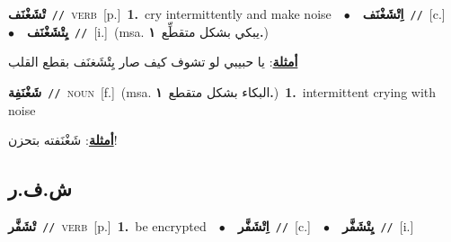 \documentclass[10pt,a4paper,twoside]{article} %
\begin{document}
\begin{multicols}{2}
{\setlength\topsep{0pt}\textbf{\foreignlanguage{arabic}{تْشَغْنَف}}\ {\color{gray}\texttt{//}\color{black}}\ \textsc{verb}\ [p.]\ \textbf{1.}~cry intermittently and make noise\ \ $\bullet$\ \ \setlength\topsep{0pt}\textbf{\foreignlanguage{arabic}{اِتْشَغْنَف}}\ {\color{gray}\texttt{//}\color{black}}\ [c.]\ \ $\bullet$\ \ \setlength\topsep{0pt}\textbf{\foreignlanguage{arabic}{يِتْشَغْنَف}}\ {\color{gray}\texttt{//}\color{black}}\ [i.]\ \color{gray}(msa. \foreignlanguage{arabic}{يبكي بشكل متقطِّع}~\foreignlanguage{arabic}{\textbf{١.}})\color{black}\  \begin{flushright}\color{gray}\foreignlanguage{arabic}{\textbf{\underline{\foreignlanguage{arabic}{أمثلة}}}: يا حبيبي لو تشوف كيف صار يِتْشَغنَف بقطع القلب}\end{flushright}\color{black}} \vspace{2mm}

{\setlength\topsep{0pt}\textbf{\foreignlanguage{arabic}{شَغْنَفِة}}\ {\color{gray}\texttt{//}\color{black}}\ \textsc{noun}\ [f.]\ \color{gray}(msa. \foreignlanguage{arabic}{البكاء بشكل متقطع}~\foreignlanguage{arabic}{\textbf{١.}})\color{black}\ \textbf{1.}~intermittent crying with noise\  \begin{flushright}\color{gray}\foreignlanguage{arabic}{\textbf{\underline{\foreignlanguage{arabic}{أمثلة}}}: شَغْنَفته بتحزن!}\end{flushright}\color{black}} \vspace{2mm}

\vspace{-3mm}
\subsection*{\color{blue}\foreignlanguage{arabic}{ش.ف.ر}\color{blue}{}} 

{\setlength\topsep{0pt}\textbf{\foreignlanguage{arabic}{تْشَفَّر}}\ {\color{gray}\texttt{//}\color{black}}\ \textsc{verb}\ [p.]\ \textbf{1.}~be encrypted\ \ $\bullet$\ \ \setlength\topsep{0pt}\textbf{\foreignlanguage{arabic}{اِتْشَفَّر}}\ {\color{gray}\texttt{//}\color{black}}\ [c.]\ \ $\bullet$\ \ \setlength\topsep{0pt}\textbf{\foreignlanguage{arabic}{يِتْشَفَّر}}\ {\color{gray}\texttt{//}\color{black}}\ [i.]\ } \vspace{2mm}


\end{multicols}
\end{document}
